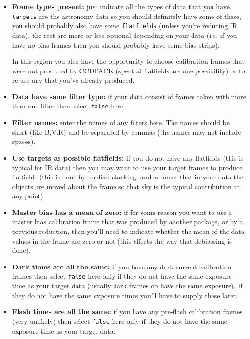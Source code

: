 \documentclass[11pt,nolof]{starlink}
\providecommand{\wlab}[1]{{\bf #1}}
\providecommand{\text}[1]{{\tt #1}}
\begin{document}
\begin{itemize}

\item \wlab{Frame types present:} just indicate all the types of data
that you have. \text{targets} are the astronomy data so you should
definitely have some of these, you should probably also have some
\text{flatfields} (unless you're reducing IR data), the rest are more
or less optional depending on your data (i.e. if you have no bias
frames then you should probably have some bias strips).

In this region you also have the opportunity to choose calibration
frames that were not produced by CCDPACK (spectral flatfields are one
possibility) or to re-use any that you've already produced.

\item \wlab{Data have same filter type:} if your data consist of
frames taken with more than one filter then select \text{false} here.

\item \wlab{Filter names:} enter the names of any filters here. The
names should be short (like B,V,R) and be separated by commas (the
names may not include spaces).

\item \wlab{Use targets as possible flatfields:} if you do not have
any flatfields (this is typical for IR data) then you may want to use
your target frames to produce flatfields (this is done by median
stacking, and assumes that in your data the objects are moved about the
frame so that sky is the typical contribution at any point).

\item \wlab{Master bias has a mean of zero:} if for some reason you
want to use a master bias calibration frame that was produced by
another package, or by a previous reduction, then you'll need to
indicate whether the mean of the data values in the frame are zero or
not (this effects the way that debiassing is done).

\item \wlab{Dark times are all the same:} if you have any dark
current calibration frames then select \text{false} here only if they
do not have the same exposure time as your target data (usually dark
frames do have the same exposure). If they do not have the same
exposure times you'll have to supply these later.

\item \wlab{Flash times are all the same:} if you have any pre-flash
calibration frames (very unlikely) then select \text{false} here only
if they do not have the same exposure time as your target data.

\end{itemize}
\end{document}

